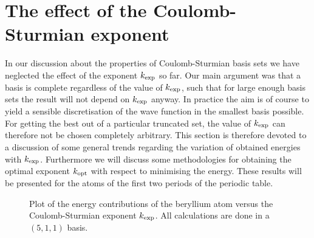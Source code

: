 \section{The effect of the Coulomb-Sturmian exponent}
\label{sec:kexp}

In our discussion about the properties of Coulomb-Sturmian basis sets
we have  neglected the effect of the \CS exponent $\kexp$ so far.
Our main argument was that a \CS basis is complete regardless of the
value of $\kexp$,
such that for large enough \CS basis sets
the result will not depend on $\kexp$ anyway.
In practice the aim is of course to yield a sensible
discretisation of the wave function in the smallest basis possible.
For getting the best out of a particular truncated set,
the value of $\kexp$ can therefore not be chosen completely arbitrary.
This section is therefore devoted to a discussion
of some general trends regarding
the variation of obtained energies with $\kexp$.
Furthermore we will discuss some methodologies
for obtaining the optimal exponent $k_\text{opt}$ with respect to minimising the \HF energy.
These results will be presented for the
atoms of the first two periods of the periodic table.

\begin{figure}
	\centering
	\caption[
		Plot of the \HF energy contributions
		versus the \CS exponent $\kexp$
	]{
		Plot of the \HF energy contributions
		of the beryllium
		atom versus the Coulomb-Sturmian exponent $\kexp$.
		All calculations are done in a $(5,1,1)$ \CS basis.
	}
	\label{fig:EnergyTermsVsK}
\end{figure}

